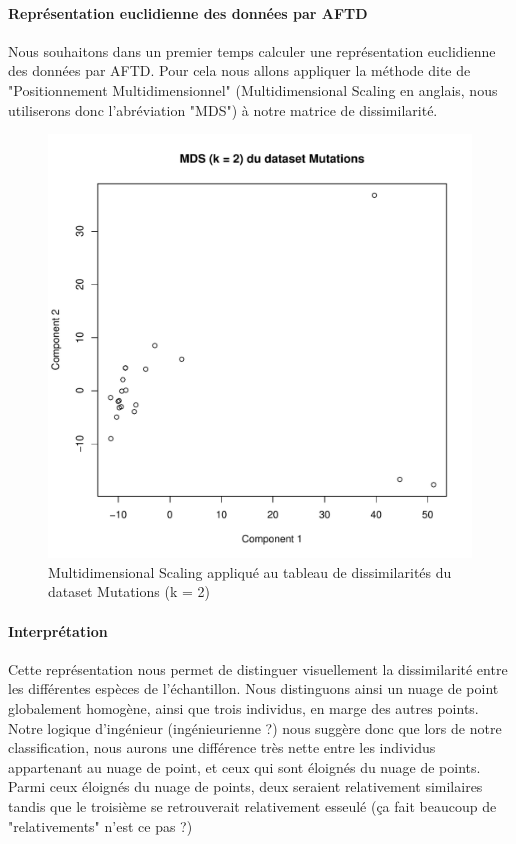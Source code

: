 \documentclass{report}
\begin{document}
\paragraph{Représentation euclidienne des données par AFTD}
Nous souhaitons dans un premier temps calculer une représentation euclidienne des données par AFTD. Pour cela nous allons appliquer la méthode dite de "Positionnement Multidimensionnel" (Multidimensional Scaling en anglais, nous utiliserons donc l'abréviation "MDS") à notre matrice de dissimilarité.
\begin{figure}[ht!]
\begin{center}
    \includegraphics[width=\textwidth]{../plots/E1Q3_1.pdf}
    \caption{Multidimensional Scaling appliqué au tableau de dissimilarités du dataset Mutations (k = 2)}
\end{center}
\end{figure}
\newpage
\paragraph{Interprétation}
Cette représentation nous permet de distinguer visuellement la dissimilarité entre les différentes espèces de l'échantillon. Nous distinguons ainsi un nuage de point globalement homogène, ainsi que trois individus, en marge des autres points. Notre logique d'ingénieur (ingénieurienne ?) nous suggère donc que lors de notre classification, nous aurons une différence très nette entre les individus appartenant au nuage de point, et ceux qui sont éloignés du nuage de points. Parmi ceux éloignés du nuage de points, deux seraient relativement similaires tandis que le troisième se retrouverait relativement esseulé (ça fait beaucoup de "relativements" n'est ce pas ?)
\end{document}
